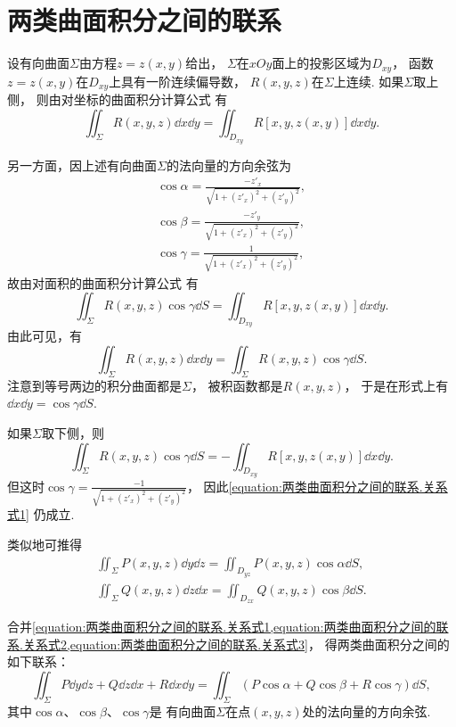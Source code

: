 \section{两类曲面积分之间的联系}
设有向曲面\(\Sigma\)由方程\(z = z(x,y)\)给出，
\(\Sigma\)在\(xOy\)面上的投影区域为\(D_{xy}\)，
函数\(z = z(x,y)\)在\(D_{xy}\)上具有一阶连续偏导数，
\(R(x,y,z)\)在\(\Sigma\)上连续.
如果\(\Sigma\)取上侧，
则由对坐标的曲面积分计算公式  有\[
	\iint_\Sigma R(x,y,z) \dd{x}\dd{y} = \iint_{D_{xy}} R[x,y,z(x,y)] \dd{x}\dd{y}.
\]

另一方面，因上述有向曲面\(\Sigma\)的法向量的方向余弦为\[
	\begin{split}
		\cos\alpha=\frac{-z'_x}{\sqrt{1+(z'_x)^2+(z'_y)^2}}, \\
		\cos\beta=\frac{-z'_y}{\sqrt{1+(z'_x)^2+(z'_y)^2}}, \\
		\cos\gamma=\frac{1}{\sqrt{1+(z'_x)^2+(z'_y)^2}},
	\end{split}
\]
故由对面积的曲面积分计算公式  有\[
	\iint_\Sigma R(x,y,z) \cos\gamma \dd{S}
	= \iint_{D_{xy}} R[x,y,z(x,y)] \dd{x}\dd{y}.
\]
由此可见，有\begin{equation}\label{equation:两类曲面积分之间的联系.关系式1}
	\iint_\Sigma R(x,y,z) \dd{x}\dd{y}
	= \iint_\Sigma R(x,y,z) \cos\gamma \dd{S}.
\end{equation}
注意到等号两边的积分曲面都是\(\Sigma\)，
被积函数都是\(R(x,y,z)\)，
于是在形式上有\(\dd{x}\dd{y} = \cos\gamma \dd{S}\).

如果\(\Sigma\)取下侧，则\[
	\iint_\Sigma R(x,y,z) \cos\gamma \dd{S}
	= -\iint_{D_{xy}} R[x,y,z(x,y)] \dd{x}\dd{y}.
\]
但这时\(\cos\gamma=\frac{-1}{\sqrt{1+(z'_x)^2+(z'_y)^2}}\)，
因此\cref{equation:两类曲面积分之间的联系.关系式1} 仍成立.

类似地可推得\begin{gather}
	\iint_\Sigma P(x,y,z) \dd{y}\dd{z}
	= \iint_{D_{yz}} P(x,y,z) \cos\alpha \dd{S},
	\label{equation:两类曲面积分之间的联系.关系式2} \\
	\iint_\Sigma Q(x,y,z) \dd{z}\dd{x}
	= \iint_{D_{zx}} Q(x,y,z) \cos\beta \dd{S}.
	\label{equation:两类曲面积分之间的联系.关系式3}
\end{gather}

合并\cref{equation:两类曲面积分之间的联系.关系式1,equation:两类曲面积分之间的联系.关系式2,equation:两类曲面积分之间的联系.关系式3}，
得两类曲面积分之间的如下联系：
\begin{equation}\label{equation:线积分与面积分.两类曲面积分之间的联系}
	\iint_\Sigma P \dd{y}\dd{z} + Q \dd{z}\dd{x} + R \dd{x}\dd{y}
	=\iint_\Sigma (P\cos\alpha+Q\cos\beta+R\cos\gamma) \dd{S},
\end{equation}
其中\(\cos\alpha\)、\(\cos\beta\)、\(\cos\gamma\)是
有向曲面\(\Sigma\)在点\((x,y,z)\)处的法向量的方向余弦.

